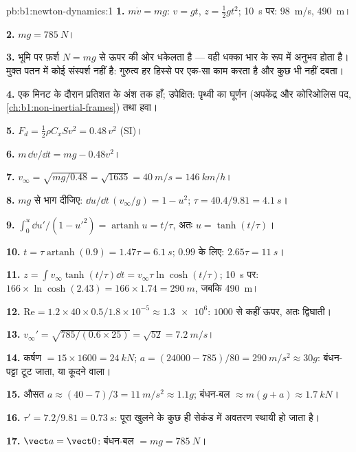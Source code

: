 \begin{solution}{pb:b1:newton-dynamics:1}
\textbf{1.} $m\dot v = mg$: $v = gt$, $z = \tfrac12 gt^2$; \qty{10}{s} पर:
\qty{98}{m/s}, \qty{490}{m}।

\textbf{2.} $mg = \qty{785}{N}$।

\textbf{3.} भूमि पर फ़र्श $N = mg$ से ऊपर की ओर धकेलता है --- वही धक्का भार
के रूप में अनुभव होता है। मुक्त पतन में कोई संस्पर्श  नहीं है: गुरुत्व
हर हिस्से पर एक-सा काम करता है और कुछ भी नहीं दबता।

\textbf{4.} एक मिनट के दौरान प्रतिशत के अंश तक हाँ; उपेक्षित: पृथ्वी का
घूर्णन (अपकेंद्र और कोरिओलिस पद,
\cref{ch:b1:non-inertial-frames}) तथा हवा।

\textbf{5.} $F_d = \tfrac12\rho C_xSv^2 = 0.48\,v^2$ (SI)।

\textbf{6.} $m\,\dd v/\dd t = mg - 0.48v^2$।

\textbf{7.} $v_\infty = \sqrt{mg/0.48} = \sqrt{1635} = \qty{40}{m/s} =
\qty{146}{km/h}$।

\textbf{8.} $mg$ से भाग दीजिए: $\dd u/\dd t\,(v_\infty/g) = 1 - u^2$;
$\tau = 40.4/9.81 = \qty{4.1}{s}$।

\textbf{9.} $\int_0^u\dd u'/(1 - u'^2) = \operatorname{artanh}u = t/\tau$,
अतः $u = \tanh(t/\tau)$।

\textbf{10.} $t = \tau\operatorname{artanh}(0.9) = 1.47\tau = \qty{6.1}{s}$;
$0.99$ के लिए: $2.65\tau = \qty{11}{s}$।

\textbf{11.} $z = \int v_\infty\tanh(t/\tau)\dd t = v_\infty\tau\ln\cosh(t/\tau)$;
\qty{10}{s} पर: $166 \times \ln\cosh(2.43) = 166 \times 1.74 = \qty{290}{m}$,
जबकि \qty{490}{m}।

\textbf{12.} $\mathrm{Re} = 1.2 \times 40 \times 0.5/1.8\times10^{-5} \approx
\num{1.3e6}$: $1000$ से कहीं ऊपर, अतः द्विघाती।

\textbf{13.} $v_\infty' = \sqrt{785/(0.6 \times 25)} = \sqrt{52} = \qty{7.2}{m/s}$।

\textbf{14.} कर्षण $= 15 \times 1600 = \qty{24}{kN}$; $a = (24000 - 785)/80
= \qty{290}{m/s^2} \approx 30g$: बंधन-पट्टा टूट जाता, या कूदने वाला।

\textbf{15.} औसत $a \approx (40 - 7)/3 = \qty{11}{m/s^2} \approx 1.1g$;
बंधन-बल $\approx m(g + a) \approx \qty{1.7}{kN}$।

\textbf{16.} $\tau' = 7.2/9.81 = \qty{0.73}{s}$: पूरा खुलने के कुछ ही
सेकंड में अवतरण स्थायी हो जाता है।

\textbf{17.} $\vect a = \vect 0$: बंधन-बल $= mg = \qty{785}{N}$।


\end{solution}
